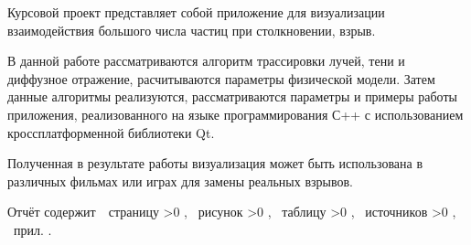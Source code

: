 \Referat

\hfill

Курсовой проект представляет собой приложение для визуализации взаимодействия большого числа частиц при столкновении, взрыв. 

В данной работе рассматриваются алгоритм трассировки лучей, тени и диффузное отражение, расчитываются параметры физической модели. Затем данные алгоритмы реализуются, рассматриваются параметры и примеры работы приложения, реализованного на языке программирования С++ с использованием кроссплатформенной библиотеки Qt. 

Полученная в результате работы визуализация может быть использована в различных фильмах или играх для замены реальных взрывов. 

Отчёт содержит \pageref{LastPage}\,~страницу%
    \ifnum \totfig >0
    , \totfig~рисунок%
    \fi
    \ifnum \tottab >0
    , \tottab~таблицу%
    \fi
    \ifnum \totbib >0
    , \totbib~источников%
    \fi
    \ifnum \totapp >0
    , \totapp~прил.%
    \else
    .%
    \fi

